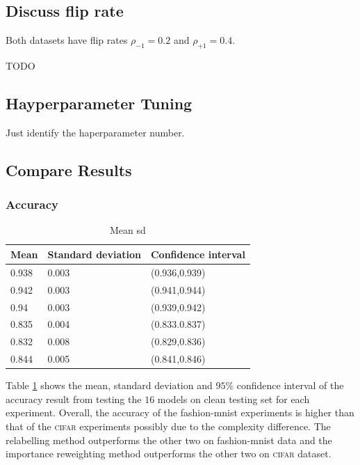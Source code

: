 \documentclass[12pt]{article} %
\newcommand{\rhoo}{\rho_{+1}}
\newcommand{\rhoz}{\rho_{-1}}
\begin{document}
\subsection{Discuss flip rate}

Both datasets have flip rates $\rhoz=0.2$ and $\rhoo=0.4$.

{\color{red} TODO }

\subsection{Hayperparameter Tuning}
Just identify the haperparameter number.

\subsection{Compare Results}
\subsubsection{Accuracy}

\begin{table}[tbh]
	\caption{Mean sd}
	\label{tab:Meansd}
\centering
\begin{tabular}{@{}lll@{}}
\toprule
Mean  & Standard deviation & Confidence interval \\ \midrule
0.938 & 0.003              & (0.936,0.939)       \\
0.942 & 0.003              & (0.941,0.944)       \\
0.94  & 0.003              & (0.939,0.942)       \\
0.835 & 0.004              & (0.833.0.837)       \\
0.832 & 0.008              & (0.829,0.836)       \\
0.844 & 0.005              & (0.841,0.846)       \\ \bottomrule
\end{tabular}

\end{table}

Table \ref{tab:Meansd} shows the mean, standard deviation and $95\%$ confidence interval of the accuracy result from testing the $16$ models on clean testing set for each experiment. 
Overall, the accuracy of the fashion-mnist experiments is higher than that of the \textsc{cifar} experiments possibly due to the complexity difference.
The relabelling method outperforms the other two on fashion-mnist data and the importance reweighting method outperforms the other two on \textsc{cifar} dataset.
\end{document}
